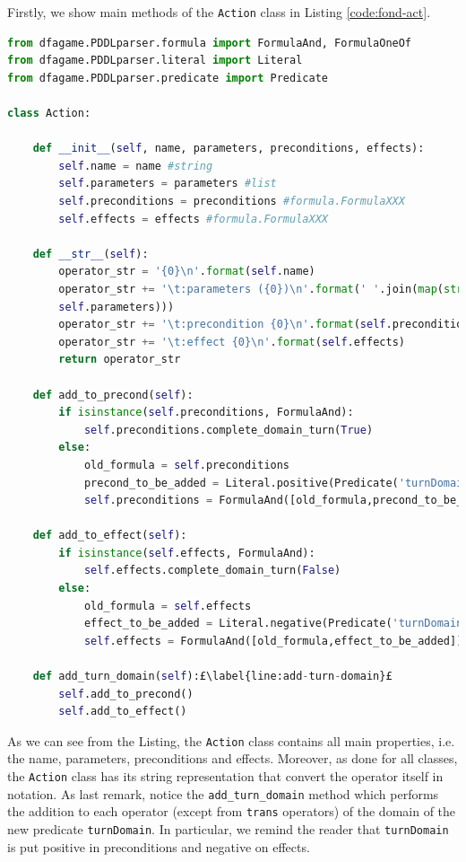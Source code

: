 Firstly, we show main methods of the \texttt{Action} class in Listing \ref{code:fond-act}.

\begin{lstlisting}[language=Python, style=Python, escapechar = £,  label={code:fond-act}, caption={The \texttt{Action} class.}]
from dfagame.PDDLparser.formula import FormulaAnd, FormulaOneOf
from dfagame.PDDLparser.literal import Literal
from dfagame.PDDLparser.predicate import Predicate

class Action:

    def __init__(self, name, parameters, preconditions, effects):
        self.name = name #string
        self.parameters = parameters #list
        self.preconditions = preconditions #formula.FormulaXXX
        self.effects = effects #formula.FormulaXXX

    def __str__(self):
        operator_str = '{0}\n'.format(self.name)
        operator_str += '\t:parameters ({0})\n'.format(' '.join(map(str, 
        self.parameters)))
        operator_str += '\t:precondition {0}\n'.format(self.preconditions)
        operator_str += '\t:effect {0}\n'.format(self.effects)
        return operator_str

    def add_to_precond(self):
        if isinstance(self.preconditions, FormulaAnd):
            self.preconditions.complete_domain_turn(True)
        else:
            old_formula = self.preconditions
            precond_to_be_added = Literal.positive(Predicate('turnDomain'))
            self.preconditions = FormulaAnd([old_formula,precond_to_be_added])

    def add_to_effect(self):
        if isinstance(self.effects, FormulaAnd):
            self.effects.complete_domain_turn(False)
        else:
            old_formula = self.effects
            effect_to_be_added = Literal.negative(Predicate('turnDomain'))
            self.effects = FormulaAnd([old_formula,effect_to_be_added])

    def add_turn_domain(self):£\label{line:add-turn-domain}£
        self.add_to_precond()
        self.add_to_effect()
\end{lstlisting}

As we can see from the Listing, the \texttt{Action} class contains all main properties, i.e. the name, parameters, preconditions and effects. Moreover, as done for all classes, the \texttt{Action} class has its string representation that convert the operator itself in \PDDL notation. As last remark, notice the \texttt{add\_turn\_domain} method which performs the addition to each operator (except from \texttt{trans} operators) of the domain of the new predicate \texttt{turnDomain}. In particular, we remind the reader that \texttt{turnDomain} is put positive in preconditions and negative on effects.

